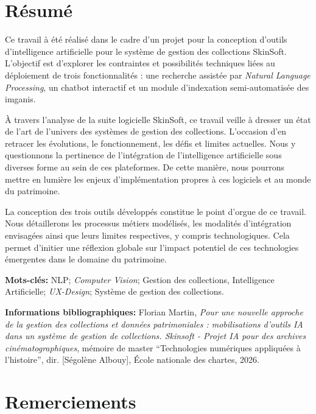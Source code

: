 \documentclass[12pt,twoside]{book}
\begin{document}
	\thispagestyle{empty}	
	\cleardoublepage
	
\frontmatter

	\chapter{Résumé}
\medskip
	Ce travail à été réalisé dans le cadre d'un projet pour la conception d'outils d'intelligence artificielle pour le système de gestion des collections SkinSoft. L'objectif est d'explorer les contraintes et possibilités techniques liées au déploiement de trois fonctionnalités : une recherche assistée par \textit{Natural Language Processing}, un \gls{chatbot} interactif et un module d'indexation semi-automatisée des \glspl{imgani}.
	
	À travers l'analyse de la suite logicielle SkinSoft, ce travail veille à dresser un état de l'art de l'univers des systèmes de gestion des collections. L'occasion d'en retracer les évolutions, le fonctionnement, les défis et limites actuelles. Nous y questionnons la pertinence de l'intégration de l'intelligence artificielle sous diverses forme au sein de ces plateformes. De cette manière, nous pourrons mettre en lumière les enjeux d'implémentation propres à ces logiciels et au monde du patrimoine.
	
	La conception des trois outils développés constitue le point d'orgue de ce travail. Nous détaillerons les processus métiers modélisés, les modalités d'intégration envisagées ainsi que leurs limites respectives, y compris technologiques. Cela permet d'initier une réflexion globale sur l'impact potentiel de ces technologies émergentes dans le domaine du patrimoine.\newline
	
	\textbf{Mots-clés:} NLP; \textit{Computer Vision}; Gestion des collections, Intelligence Artificielle; \textit{UX-Design}; Système de gestion des collections.\newline
	
	\textbf{Informations bibliographiques:} Florian Martin, \textit{Pour une nouvelle approche de la gestion des collections et données patrimoniales : mobilisations d'outils IA dans un système de gestion de collections. Skinsoft - Projet IA pour des archives cinématographiques}, mémoire de master \enquote{Technologies numériques appliquées à l'histoire}, dir. [Ségolène Albouy], École nationale des chartes, 2026.
	
		\newpage{\pagestyle{empty}\cleardoublepage}
	
	\chapter{Remerciements}
	
\end{document}
